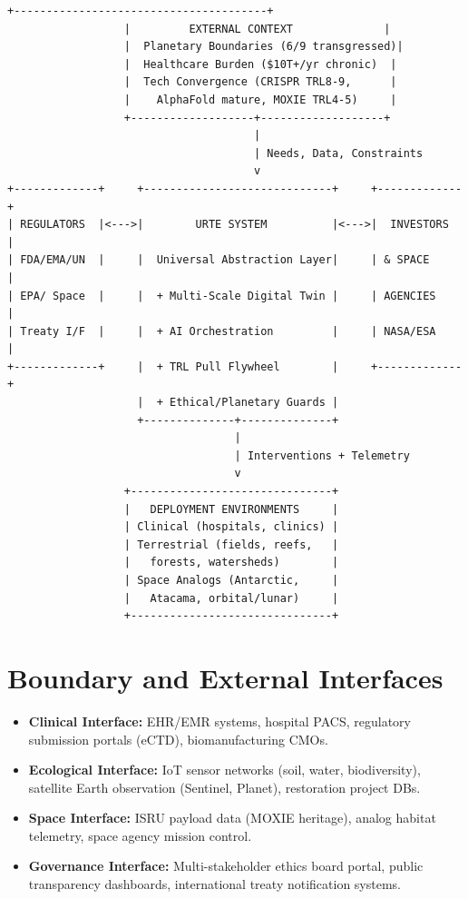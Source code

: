 \documentclass[11pt,a4paper]{report}
\begin{document}
\begin{lstlisting}[style=asciistyle, caption={URTE System Context Diagram}]
                  +---------------------------------------+
                  |         EXTERNAL CONTEXT              |
                  |  Planetary Boundaries (6/9 transgressed)|
                  |  Healthcare Burden ($10T+/yr chronic)  |
                  |  Tech Convergence (CRISPR TRL8-9,      |
                  |    AlphaFold mature, MOXIE TRL4-5)     |
                  +-------------------+-------------------+
                                      |
                                      | Needs, Data, Constraints
                                      v
+-------------+     +-----------------------------+     +-------------+
| REGULATORS  |<--->|        URTE SYSTEM          |<--->|  INVESTORS  |
| FDA/EMA/UN  |     |  Universal Abstraction Layer|     | & SPACE     |
| EPA/ Space  |     |  + Multi-Scale Digital Twin |     | AGENCIES    |
| Treaty I/F  |     |  + AI Orchestration         |     | NASA/ESA    |
+-------------+     |  + TRL Pull Flywheel        |     +-------------+
                    |  + Ethical/Planetary Guards |     
                    +--------------+--------------+     
                                   |
                                   | Interventions + Telemetry
                                   v
                  +-------------------------------+
                  |   DEPLOYMENT ENVIRONMENTS     |
                  | Clinical (hospitals, clinics) |
                  | Terrestrial (fields, reefs,   |
                  |   forests, watersheds)        |
                  | Space Analogs (Antarctic,     |
                  |   Atacama, orbital/lunar)     |
                  +-------------------------------+
\end{lstlisting}

\section{Boundary and External Interfaces}

\begin{itemize}
    \item \textbf{Clinical Interface:} EHR/EMR systems, hospital PACS, regulatory submission portals (eCTD), biomanufacturing CMOs.
    \item \textbf{Ecological Interface:} IoT sensor networks (soil, water, biodiversity), satellite Earth observation (Sentinel, Planet), restoration project DBs.
    \item \textbf{Space Interface:} ISRU payload data (MOXIE heritage), analog habitat telemetry, space agency mission control.
    \item \textbf{Governance Interface:} Multi-stakeholder ethics board portal, public transparency dashboards, international treaty notification systems.
\end{itemize}
\end{document}
